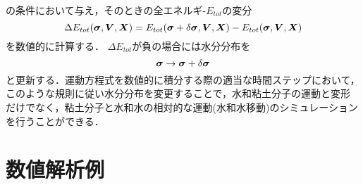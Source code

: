 ﻿\documentclass[11pt,a4j]{jarticle}
\begin{document}
の条件において与え，そのときの全エネルギ-$E_{tot}$の変分
\begin{equation}
	\Delta E_{tot}(\mbox{\boldmath $\sigma$},\mbox{\boldmath $V$},\mbox{\boldmath $X$})=
	E_{tot}(\mbox{\boldmath $\sigma$}+\delta \mbox{\boldmath $\sigma$},\mbox{\boldmath $V$},\mbox{\boldmath $X$})
	-
	E_{tot}(\mbox{\boldmath $\sigma$},\mbox{\boldmath $V$},\mbox{\boldmath $X$})
	\label{eqn:}
\end{equation}
を数値的に計算する．
$\Delta E_{tot}$が負の場合には水分分布を
\begin{equation}
	\mbox{\boldmath $\sigma$}\rightarrow \mbox{\boldmath $\sigma$}+\delta \mbox{\boldmath $\sigma$}
	\label{eqn:sig_update}
\end{equation}
と更新する．運動方程式を数値的に積分する際の適当な時間ステップにおいて，
このような規則に従い水分分布を変更することで，水和粘土分子の運動と変形
だけでなく，粘土分子と水和水の相対的な運動(水和水移動)のシミュレーション
を行うことができる．
\section{数値解析例}
\end{document}
